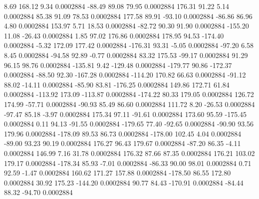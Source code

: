         8.69      168.12        9.34     0.0002884
      -88.49       89.08       79.95     0.0002884
      176.31       91.22        5.14     0.0002884
       85.38       91.09       78.53     0.0002884
      177.58       89.91      -93.10     0.0002884
      -86.86       86.96        4.80     0.0002884
      153.97        5.71       18.53     0.0002884
      -82.72       90.30       91.90     0.0002884
     -155.20       11.08      -26.43     0.0002884
        1.85       97.02      176.86     0.0002884
      178.95       94.53     -174.40     0.0002884
       -5.32      172.09      177.42     0.0002884
     -176.31       93.31       -5.05     0.0002884
      -97.20        6.58        8.45     0.0002884
      -94.58       92.89       -0.77     0.0002884
       83.32      175.53      -99.17     0.0002884
       91.29       96.15       98.76     0.0002884
     -135.81        9.42     -129.48     0.0002884
     -179.77       90.86     -172.37     0.0002884
      -88.50       92.30     -167.28     0.0002884
     -114.20      170.82       66.63     0.0002884
      -91.12       88.02      -14.11     0.0002884
      -85.90       83.81     -176.25     0.0002884
      149.86      172.71       61.84     0.0002884
     -113.92      173.09     -113.87     0.0002884
     -174.22       80.33      179.05     0.0002884
      126.72      174.99      -57.71     0.0002884
      -90.93       85.49       86.60     0.0002884
      111.72        8.20      -26.53     0.0002884
      -97.47       85.18       -3.97     0.0002884
      175.34       97.11      -91.61     0.0002884
      173.60       95.59     -175.45     0.0002884
        0.11       94.13      -91.55     0.0002884
     -179.65       77.40      -92.65     0.0002884
      -90.90       93.56      179.96     0.0002884
     -178.09       89.53       86.73     0.0002884
     -178.00      102.45        4.04     0.0002884
      -89.00       93.23       90.19     0.0002884
      176.27       96.43      179.67     0.0002884
      -87.20       86.35       -4.11     0.0002884
      146.99        7.16       31.78     0.0002884
      176.32       87.66       87.35     0.0002884
      176.21      103.02      179.17     0.0002884
     -178.34       85.93       -7.01     0.0002884
      -86.33       90.00       98.01     0.0002884
        0.71       92.59       -1.47     0.0002884
      160.62      171.27      157.88     0.0002884
     -178.50       86.55      172.80     0.0002884
       30.92      175.23     -144.20     0.0002884
       90.77       84.43     -170.91     0.0002884
      -84.44       88.32      -94.70     0.0002884
